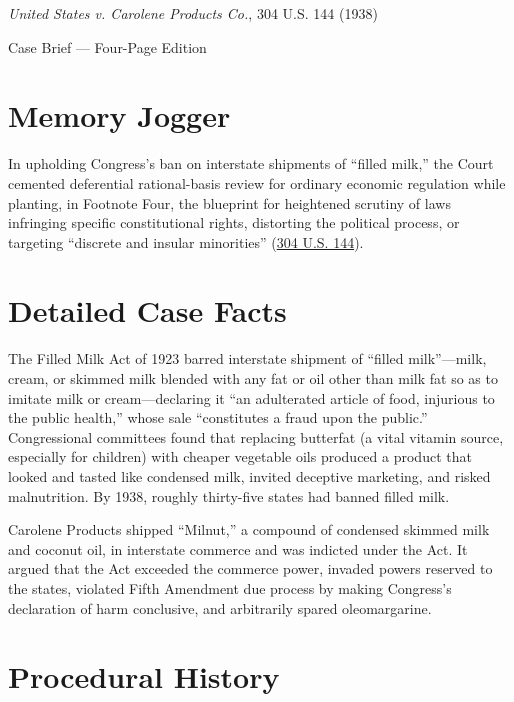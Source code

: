 \documentclass[12pt]{article}
\begin{document}
\begin{center}
{\LARGE \textit{United States v. Carolene Products Co.}, 304 U.S. 144 (1938)\par}
\vspace{0.8em}
{\large Case Brief --- Four-Page Edition\par}
\end{center}
\vspace{1em}

\section{Memory Jogger}

In upholding Congress's ban on interstate shipments of ``filled milk,'' the Court cemented deferential rational-basis review for ordinary economic regulation while planting, in Footnote Four, the blueprint for heightened scrutiny of laws infringing specific constitutional rights, distorting the political process, or targeting ``discrete and insular minorities'' (\href{https://supreme.justia.com/cases/federal/us/304/144/}{304 U.S. 144}).

\section{Detailed Case Facts}

The Filled Milk Act of 1923 barred interstate shipment of ``filled milk''---milk, cream, or skimmed milk blended with any fat or oil other than milk fat so as to imitate milk or cream---declaring it ``an adulterated article of food, injurious to the public health,'' whose sale ``constitutes a fraud upon the public.'' Congressional committees found that replacing butterfat (a vital vitamin source, especially for children) with cheaper vegetable oils produced a product that looked and tasted like condensed milk, invited deceptive marketing, and risked malnutrition. By 1938, roughly thirty-five states had banned filled milk.

Carolene Products shipped ``Milnut,'' a compound of condensed skimmed milk and coconut oil, in interstate commerce and was indicted under the Act. It argued that the Act exceeded the commerce power, invaded powers reserved to the states, violated Fifth Amendment due process by making Congress's declaration of harm conclusive, and arbitrarily spared oleomargarine.

\section{Procedural History}
\end{document}
